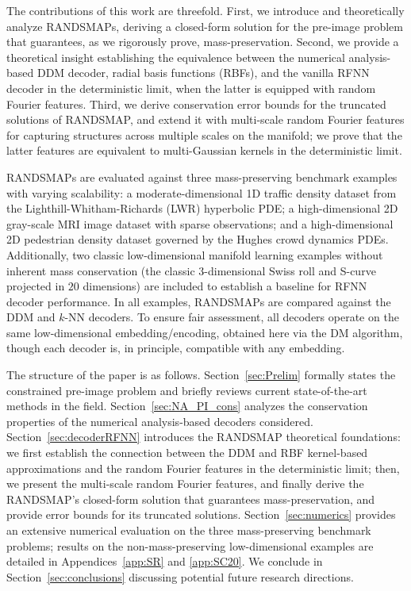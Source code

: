 \documentclass{article}
\begin{document}
The contributions of this work are threefold. %
First, we introduce and theoretically analyze RANDSMAPs, deriving a closed-form solution for the pre-image problem that guarantees, as we rigorously prove, mass-preservation. Second, we provide a theoretical insight establishing the equivalence between the numerical analysis-based DDM decoder, radial basis functions (RBFs), and the vanilla RFNN decoder in the deterministic limit, when the latter is equipped with random Fourier features. Third, we derive conservation error bounds for the truncated solutions of RANDSMAP, and extend it with multi-scale random Fourier features for capturing structures across multiple scales on the manifold; we prove that the latter features are equivalent to  multi-Gaussian kernels in the deterministic limit.  

RANDSMAPs are evaluated against three mass-preserving benchmark examples with varying scalability: a moderate-dimensional 1D traffic density dataset from the Lighthill-Whitham-Richards (LWR) hyperbolic PDE; a high-dimensional 2D gray-scale MRI image dataset with sparse observations; and a high-dimensional 2D pedestrian density dataset governed by the Hughes crowd dynamics PDEs. Additionally, two classic low-dimensional manifold learning examples without inherent mass conservation (the classic $3$-dimensional Swiss roll and S-curve projected in $20$ dimensions) are included to establish a baseline for RFNN decoder performance. In all examples, RANDSMAPs are compared against the DDM and $k$-NN decoders. To ensure fair assessment, all decoders operate on the same low-dimensional embedding/encoding, obtained here via the DM algorithm, though each decoder is, in principle, compatible with any embedding.     

The structure of the paper is as follows. Section~\ref{sec:Prelim} formally states the constrained pre-image problem and briefly reviews current state-of-the-art methods in the field. Section~\ref{sec:NA_PI_cons} analyzes the conservation properties of the numerical analysis-based decoders considered. Section~\ref{sec:decoderRFNN} introduces the RANDSMAP theoretical foundations: we first establish the connection between the DDM and RBF kernel-based approximations and the random Fourier features in the deterministic limit; then, we present the multi-scale random Fourier features, and finally derive the RANDSMAP's closed-form solution that guarantees mass-preservation, and provide error bounds for its truncated solutions. Section~\ref{sec:numerics} provides an extensive numerical evaluation on the three mass-preserving benchmark problems; results on the non-mass-preserving low-dimensional examples are detailed in Appendices~\ref{app:SR} and \ref{app:SC20}. We conclude in Section~\ref{sec:conclusions} discussing potential future research directions.
\end{document}
